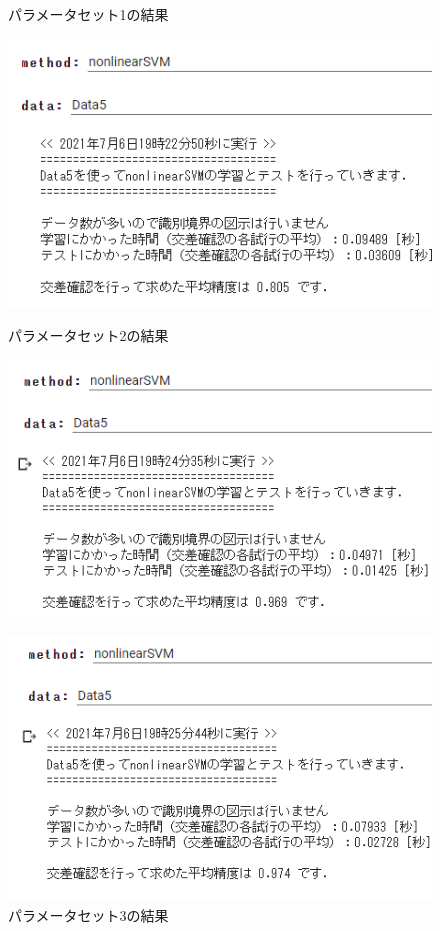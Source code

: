 \begin{figure}[htbp]
\begin{minipage}[t]{0.33\hsize}
  \end{minipage}
  \begin{minipage}[t]{0.33\hsize}
    \centering
    \caption{パラメータセット1の結果}
    \label{graph:8}
    \includegraphics[keepaspectratio, scale=0.5]{3-1-1.PNG}
  \end{minipage}
  \begin{minipage}[t]{0.33\hsize}
    \centering
    \caption{パラメータセット2の結果}
    \label{graph:9}
    \includegraphics[keepaspectratio, scale=0.5]{3-1-2.PNG}
  \end{minipage}
  \begin{minipage}[t]{0.33\hsize}
    \centering
    \caption{パラメータセット3の結果}
    \label{graph:10}
    \includegraphics[keepaspectratio, scale=0.5]{3-1-3.PNG}
  \end{minipage}
\end{figure}

